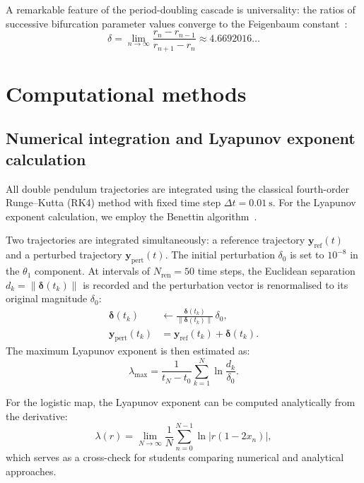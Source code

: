 \documentclass[aps,twocolumn,showpacs]{revtex4-2}
\begin{document}
A remarkable feature of the period-doubling cascade is universality: the ratios of successive bifurcation
parameter values converge to the Feigenbaum constant~\cite{Feigenbaum1978}:
\begin{equation}
\delta = \lim_{n\to\infty} \frac{r_n - r_{n-1}}{r_{n+1} - r_n} \approx 4.6692016\ldots
\label{eq:feigenbaum}
\end{equation}

\section{Computational methods}
\label{sec:methods}

\subsection{Numerical integration and Lyapunov exponent calculation}

All double pendulum trajectories are integrated using the classical fourth-order Runge--Kutta (RK4) method
with fixed time step $\Delta t = 0.01~\text{s}$. For the Lyapunov exponent calculation, we employ the
Benettin algorithm~\cite{Benettin1980}.

Two trajectories are integrated simultaneously: a reference trajectory $\mathbf{y}_{\text{ref}}(t)$ and a
perturbed trajectory $\mathbf{y}_{\text{pert}}(t)$. The initial perturbation $\delta_0$ is set to
$10^{-8}$ in the $\theta_1$ component. At intervals of $N_{\text{ren}} = 50$ time steps, the Euclidean
separation $d_k = \|\boldsymbol{\delta}(t_k)\|$ is recorded and the perturbation vector is renormalised
to its original magnitude $\delta_0$:
\begin{align}
\boldsymbol{\delta}(t_k) &\leftarrow \frac{\boldsymbol{\delta}(t_k)}{\|\boldsymbol{\delta}(t_k)\|}\,\delta_0,\\
\mathbf{y}_{\text{pert}}(t_k) &= \mathbf{y}_{\text{ref}}(t_k) + \boldsymbol{\delta}(t_k).
\label{eq:renorm}
\end{align}
The maximum Lyapunov exponent is then estimated as:
\begin{equation}
\lambda_{\max} = \frac{1}{t_N - t_0} \sum_{k=1}^{N} \ln\frac{d_k}{\delta_0}.
\label{eq:lyapunov}
\end{equation}

For the logistic map, the Lyapunov exponent can be computed analytically from the derivative:
\begin{equation}
\lambda(r) = \lim_{N\to\infty} \frac{1}{N} \sum_{n=0}^{N-1} \ln |r(1 - 2x_n)|,
\label{eq:lyapunov_logistic}
\end{equation}
which serves as a cross-check for students comparing numerical and analytical approaches.
\end{document}
